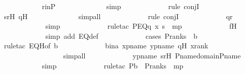 \begin{isabellebody}
\ \ \ \ \ \ \ \ \ \ \isamarkupfalse%
\ rinP\ \isanewline
\ \ \ \ \ \ \ \ \ \ \ \isamarkupfalse%
\ simp\ \isanewline
\ \ \ \ \ \ \ \ \ \ \isamarkupfalse%
\ {\isacharparenleft}{\kern0pt}rule\ conjI{\isacharparenright}{\kern0pt}\ \isanewline
\ \ \ \ \ \ \ \ \ \ \isamarkupfalse%
\ srH\ qH\ \isanewline
\ \ \ \ \ \ \ \ \ \ \ \isamarkupfalse%
\ simp{\isacharunderscore}{\kern0pt}all\ \isanewline
\ \ \ \ \ \ \ \ \ \ \isamarkupfalse%
\ {\isacharparenleft}{\kern0pt}rule\ conjI{\isacharparenright}{\kern0pt}\ \isanewline
\ \ \ \ \ \ \ \ \ \ \isamarkupfalse%
\ qr\ \isanewline
\ \ \ \ \ \ \ \ \ \ \ \isamarkupfalse%
\ simp\ \isanewline
\ \ \ \ \ \ \ \ \ \ \isamarkupfalse%
\ {\isacharparenleft}{\kern0pt}rule{\isacharunderscore}{\kern0pt}tac\ P{\isacharequal}{\kern0pt}{\isachardoublequoteopen}EQ{\isacharparenleft}{\kern0pt}q{\isacharcomma}{\kern0pt}\ x{\isacharcomma}{\kern0pt}\ s{\isacharparenright}{\kern0pt}{\isachardoublequoteclose}\ \ mp{\isacharparenright}{\kern0pt}\ \isanewline
\ \ \ \ \ \ \ \ \ \ \isamarkupfalse%
\ fH\ \isanewline
\ \ \ \ \ \ \ \ \ \ \ \isamarkupfalse%
\ {\isacharparenleft}{\kern0pt}simp\ add{\isacharcolon}{\kern0pt}\ EQ{\isacharunderscore}{\kern0pt}def{\isacharparenright}{\kern0pt}\ \isanewline
\ \ \ \ \ \ \ \ \ \ \isamarkupfalse%
\ {\isacharparenleft}{\kern0pt}cases\ {\isachardoublequoteopen}P{\isacharunderscore}{\kern0pt}rank{\isacharparenleft}{\kern0pt}s{\isacharparenright}{\kern0pt}\ {\isasymle}\ b{\isachardoublequoteclose}{\isacharparenright}{\kern0pt}\ \isanewline
\ \ \ \ \ \ \ \ \ \ \ \isamarkupfalse%
\ {\isacharparenleft}{\kern0pt}rule{\isacharunderscore}{\kern0pt}tac\ EQH{\isacharbrackleft}{\kern0pt}of\ b{\isacharbrackright}{\kern0pt}{\isacharparenright}{\kern0pt}\ \isanewline
\ \ \ \ \ \ \ \ \ \ \isamarkupfalse%
\ bina\ xpname\ ypname\ qH\ xrank\ \isanewline
\ \ \ \ \ \ \ \ \ \ \ \ \ \ \ \ \isamarkupfalse%
\ simp{\isacharunderscore}{\kern0pt}all\ \isanewline
\ \ \ \ \ \ \ \ \ \ \isamarkupfalse%
\ ypname\ srH\ P{\isacharunderscore}{\kern0pt}name{\isacharunderscore}{\kern0pt}domain{\isacharunderscore}{\kern0pt}P{\isacharunderscore}{\kern0pt}name\ \isanewline
\ \ \ \ \ \ \ \ \ \ \isamarkupfalse%
\ simp\ \isanewline
\ \ \ \ \ \ \ \ \ \ \isamarkupfalse%
\ {\isacharparenleft}{\kern0pt}rule{\isacharunderscore}{\kern0pt}tac\ P{\isacharequal}{\kern0pt}{\isachardoublequoteopen}b\ {\isasymle}\ P{\isacharunderscore}{\kern0pt}rank{\isacharparenleft}{\kern0pt}s{\isacharparenright}{\kern0pt}{\isachardoublequoteclose}\ \ mp{\isacharparenright}{\kern0pt}\ \isanewline

\end{isabellebody}
